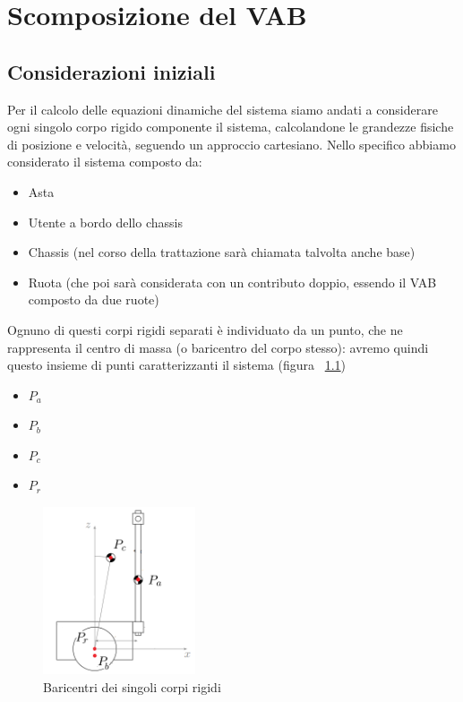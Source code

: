 \chapter{Scomposizione del VAB}
\section{Considerazioni iniziali}
Per il calcolo delle equazioni dinamiche del sistema siamo andati a considerare ogni singolo corpo rigido componente il sistema, calcolandone le grandezze fisiche di posizione e velocità, seguendo un approccio cartesiano. 
Nello specifico abbiamo considerato il sistema composto da:
\begin{itemize}
	\item Asta
	\item Utente a bordo dello chassis
	\item Chassis (nel corso della trattazione sarà chiamata talvolta anche base)
	\item Ruota (che poi sarà considerata con un contributo doppio, essendo il VAB composto da due ruote)
\end{itemize}

Ognuno di questi corpi rigidi separati è individuato da un punto, che ne rappresenta il centro di massa (o baricentro del corpo stesso): avremo quindi questo insieme di punti caratterizzanti il sistema (figura ~\ref{fig:VAB_baricentri})

\begin{itemize}
	\item \textbf{$P_a$}
	\item \textbf{$P_b$}
	\item \textbf{$P_c$}
	\item \textbf{$P_r$}
\end{itemize}

\begin{figure}[H]
	\centering   	
	\includegraphics[width=0.4\textwidth]{Immagini/VAB_baricentrum.png}
	\caption{Baricentri dei singoli corpi rigidi}
	\label{fig:VAB_baricentri}
\end{figure} 

